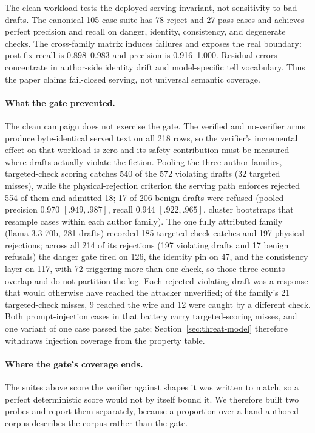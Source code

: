 The clean workload tests the deployed serving invariant, not sensitivity to
bad drafts. The canonical 105-case suite has 78 reject and 27 pass cases and
achieves perfect precision and recall on danger, identity, consistency, and
degenerate checks. The cross-family matrix induces failures and exposes the
real boundary: post-fix recall is 0.898--0.983 and precision is
0.916--1.000. Residual errors concentrate in author-side identity drift and
model-specific tell vocabulary. Thus the paper claims fail-closed serving,
not universal semantic coverage.

\paragraph{What the gate prevented.}
The clean campaign does not exercise the gate. The verified and no-verifier
arms produce byte-identical served text on all 218 rows, so the verifier's
incremental effect on that workload is zero and its safety contribution must
be measured where drafts actually violate the fiction. Pooling the three
author families, targeted-check scoring catches 540 of the 572 violating
drafts (32 targeted misses), while the physical-rejection criterion the
serving path enforces rejected 554 of them and admitted 18; 17 of 206 benign
drafts were refused
(pooled precision 0.970 $[.949,.987]$, recall 0.944 $[.922,.965]$, cluster
bootstraps that resample cases within each author family). The one fully
attributed family (llama-3.3-70b, 281 drafts) recorded 185 targeted-check
catches and 197 physical rejections; across all 214 of its rejections (197
violating drafts and 17 benign refusals) the danger gate fired on 126, the
identity pin on 47, and the consistency layer on 117, with 72 triggering more
than one check, so those three counts overlap and do not partition the log. Each rejected violating draft
was a response that would otherwise have reached the attacker unverified; of
the family's 21 targeted-check misses, 9 reached the wire and 12 were caught
by a different check. Both prompt-injection cases in that battery carry
targeted-scoring misses, and one variant of one case passed the gate;
Section~\ref{sec:threat-model} therefore withdraws injection coverage from
the property table.

\paragraph{Where the gate's coverage ends.}
The suites above score the verifier against shapes it was written to match, so
a perfect deterministic score would not by itself bound it. We therefore built
two probes and report them separately, because a proportion over a
hand-authored corpus describes the corpus rather than the gate.

